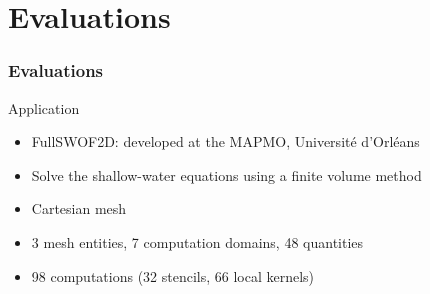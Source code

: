 \documentclass{beamer}
\begin{document}




\section{Evaluations}
\begin{frame}
\frametitle{Evaluations}
\begin{block}{Application}
\begin{itemize}
\item FullSWOF2D: developed at the MAPMO, Université d'Orléans
\item Solve the shallow-water equations using a finite volume method
\item Cartesian mesh
\item 3 mesh entities, 7 computation domains, 48 quantities
\item 98 computations (32 stencils, 66 local kernels)
\end{itemize}
\end{block}
\end{frame}
\end{document}
